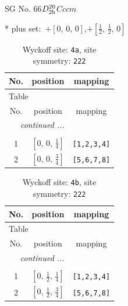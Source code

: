 \documentclass[fleqn,8pt]{jsarticle}
\begin{document}
\setcounter{MaxMatrixCols}{32}

\renewcommand{\tablename}{Table~}
\renewcommand{\figurename}{Figure~}
\begin{center}
\LARGE
SG No. 66\quad$D_{\rm 2h}^{20}$\quad$Cccm$\quad[ orthorhombic ]
\end{center}
* plus set:\,\,\,$+\left[ 0,\, 0,\, 0 \right]$,\quad $+\left[ \frac{1}{2},\, \frac{1}{2},\, 0 \right]$
\renewcommand{\arraystretch}{1.2}
\begin{longtable}{ccc}
\caption{Wyckoff site: {\tt 4a}, site symmetry: {\tt 222}}
 \\
 \hline \hline
No. & position & mapping \\ \hline \endfirsthead

\multicolumn{2}{l}{\tablename\ \thetable{}} \\
 \hline \hline
No. & position & mapping \\ \hline \endhead

 \hline \hline
\multicolumn{2}{r}{\footnotesize\it continued ...} \\ \endfoot

 \hline \hline
\multicolumn{2}{r}{} \\ \endlastfoot

1 & $\left[ 0,\, 0,\, \frac{1}{4} \right]$ & {\tt [1,2,3,4]} \\ \hline
2 & $\left[ 0,\, 0,\, \frac{3}{4} \right]$ & {\tt [5,6,7,8]} \\
\end{longtable}
\renewcommand{\arraystretch}{1.2}
\begin{longtable}{ccc}
\caption{Wyckoff site: {\tt 4b}, site symmetry: {\tt 222}}
 \\
 \hline \hline
No. & position & mapping \\ \hline \endfirsthead

\multicolumn{2}{l}{\tablename\ \thetable{}} \\
 \hline \hline
No. & position & mapping \\ \hline \endhead

 \hline \hline
\multicolumn{2}{r}{\footnotesize\it continued ...} \\ \endfoot

 \hline \hline
\multicolumn{2}{r}{} \\ \endlastfoot

1 & $\left[ 0,\, \frac{1}{2},\, \frac{1}{4} \right]$ & {\tt [1,2,3,4]} \\ \hline
2 & $\left[ 0,\, \frac{1}{2},\, \frac{3}{4} \right]$ & {\tt [5,6,7,8]} \\
\end{longtable}
\end{document}
